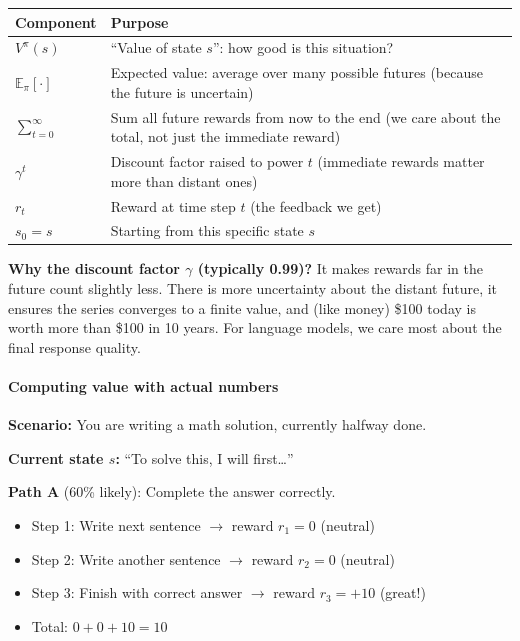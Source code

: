 \begin{chapterenv}
\begin{infobox}
\begin{center}
\begin{tabular}{p{}p{}}
\toprule
\textbf{Component} & \textbf{Purpose} \\
\midrule
$V^\pi(s)$ & ``Value of state $s$'': how good is this situation? \\
$\mathbb{E}_\pi[\cdot]$ & Expected value: average over many possible futures (because the future is uncertain) \\
$\sum_{t=0}^\infty$ & Sum all future rewards from now to the end (we care about the total, not just the immediate reward) \\
$\gamma^t$ & Discount factor raised to power $t$ (immediate rewards matter more than distant ones) \\
$r_t$ & Reward at time step $t$ (the feedback we get) \\
$s_0 = s$ & Starting from this specific state $s$ \\
\bottomrule
\end{tabular}
\end{center}

\textbf{Why the discount factor $\gamma$ (typically 0.99)?} It makes rewards far in the future count slightly less. There is more uncertainty about the distant future, it ensures the series converges to a finite value, and (like money) \$100 today is worth more than \$100 in 10 years. For language models, we care most about the final response quality.
\end{infobox}

\paragraph{Computing value with actual numbers}

\textbf{Scenario:} You are writing a math solution, currently halfway done.

\textbf{Current state $s$:} ``To solve this, I will first\ldots''

\textbf{Path A} (60\% likely): Complete the answer correctly.
\begin{itemize}[nosep]
    \item Step 1: Write next sentence $\to$ reward $r_1 = 0$ (neutral)
    \item Step 2: Write another sentence $\to$ reward $r_2 = 0$ (neutral)
    \item Step 3: Finish with correct answer $\to$ reward $r_3 = +10$ (great!)
    \item Total: $0 + 0 + 10 = 10$
\end{itemize}


\end{chapterenv}
